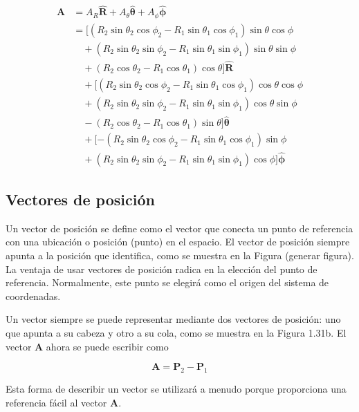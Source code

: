 \documentclass{book}
\begin{document}
\begin{align*}
\mathbf{A} &= A_R \mathbf{\hat{R}} + A_{\theta} \mathbf{\hat{\theta}} + A_{\phi} \mathbf{\hat{\phi}} \\
&= [(R_2 \sin \theta_2 \cos \phi_2 - R_1 \sin \theta_1 \cos \phi_1) \sin \theta \cos \phi \\
&\quad + (R_2 \sin \theta_2 \sin \phi_2 - R_1 \sin \theta_1 \sin \phi_1) \sin \theta \sin \phi \\
&\quad + (R_2 \cos \theta_2 - R_1 \cos \theta_1) \cos \theta] \mathbf{\hat{R}} \\
&\quad + [(R_2 \sin \theta_2 \cos \phi_2 - R_1 \sin \theta_1 \cos \phi_1) \cos \theta \cos \phi \\
&\quad + (R_2 \sin \theta_2 \sin \phi_2 - R_1 \sin \theta_1 \sin \phi_1) \cos \theta \sin \phi \\
&\quad - (R_2 \cos \theta_2 - R_1 \cos \theta_1) \sin \theta] \mathbf{\hat{\theta}} \\
&\quad + [-(R_2 \sin \theta_2 \cos \phi_2 - R_1 \sin \theta_1 \cos \phi_1) \sin \phi \\
&\quad + (R_2 \sin \theta_2 \sin \phi_2 - R_1 \sin \theta_1 \sin \phi_1) \cos \phi] \mathbf{\hat{\phi}}
\end{align*}

\subsection{Vectores de posición}

Un vector de posición se define como el vector que conecta un punto de referencia con una ubicación o posición (punto) en el espacio. El vector de posición siempre apunta a la posición que identifica, como se muestra en la Figura (generar figura). La ventaja de usar vectores de posición radica en la elección del punto de referencia. Normalmente, este punto se elegirá como el origen del sistema de coordenadas.

Un vector siempre se puede representar mediante dos vectores de posición: uno que apunta a su cabeza y otro a su cola, como se muestra en la Figura 1.31b. El vector $\mathbf{A}$ ahora se puede escribir como

\begin{equation}
\mathbf{A} = \mathbf{P}_2 - \mathbf{P}_1
\end{equation}

Esta forma de describir un vector se utilizará a menudo porque proporciona una referencia fácil al vector $\mathbf{A}$.
\end{document}
